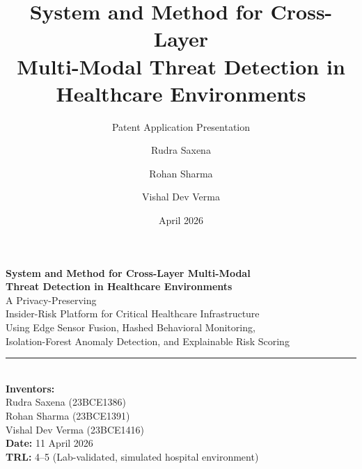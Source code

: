 \documentclass[10pt, aspectratio=169]{beamer}
\title[Cross-Layer Threat Detection]{\textbf{System and Method for Cross-Layer\\Multi-Modal Threat Detection in\\Healthcare Environments}}
\subtitle{Patent Application Presentation}
\author{Rudra Saxena \and Rohan Sharma \and Vishal Dev Verma}
\institute{Patent Application Presentation}
\date{April 2026}
\begin{document}
\begin{frame}[plain]
  \vfill
  \begin{center}
    {\large\textbf{\textcolor{patentblue}{System and Method for Cross-Layer Multi-Modal\\Threat Detection in Healthcare Environments}}}\\[14pt]
    {\normalsize A Privacy-Preserving\\
    Insider-Risk Platform for Critical Healthcare Infrastructure\\
    Using Edge Sensor Fusion, Hashed Behavioral Monitoring,\\
    Isolation-Forest Anomaly Detection, and Explainable Risk Scoring}\\[18pt]
    \textcolor{accentgold}{\rule{0.5\textwidth}{1pt}}\\[12pt]
    {\small\textbf{Inventors:}}\\[4pt]
    {\small Rudra Saxena (23BCE1386)}\\[2pt]
    {\small Rohan Sharma (23BCE1391)}\\[2pt]
    {\small Vishal Dev Verma (23BCE1416)}\\[10pt]
    {\small\textbf{Date:} 11 April 2026}\\[4pt]
    {\small\textbf{TRL:} 4--5 (Lab-validated, simulated hospital environment)}
  \end{center}
  \vfill
\end{frame}
\end{document}
